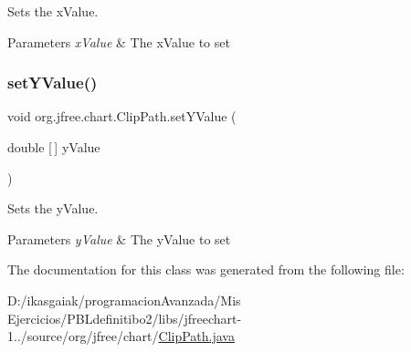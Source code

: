 Sets the x\+Value.


\begin{DoxyParams}{Parameters}
{\em x\+Value} & The x\+Value to set \\
\hline
\end{DoxyParams}
\mbox{\label{classorg_1_1jfree_1_1chart_1_1_clip_path_aa83937e9ffac80489830dd43f4692405}} 
\subsubsection{\texorpdfstring{set\+Y\+Value()}{setYValue()}}
{\footnotesize\ttfamily void org.\+jfree.\+chart.\+Clip\+Path.\+set\+Y\+Value (\begin{DoxyParamCaption}\item[{double \mbox{[}$\,$\mbox{]}}]{y\+Value }\end{DoxyParamCaption})}

Sets the y\+Value.


\begin{DoxyParams}{Parameters}
{\em y\+Value} & The y\+Value to set \\
\hline
\end{DoxyParams}


The documentation for this class was generated from the following file\+:\begin{DoxyCompactItemize}
\item 
D\+:/ikasgaiak/programacion\+Avanzada/\+Mis Ejercicios/\+P\+B\+Ldefinitibo2/libs/jfreechart-\/1../source/org/jfree/chart/\mbox{\hyperlink{_clip_path_8java}{Clip\+Path.\+java}}\end{DoxyCompactItemize}

